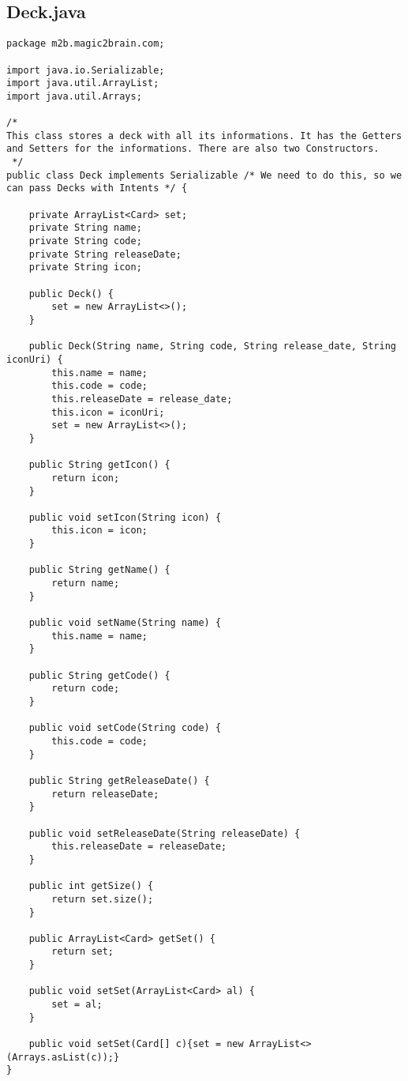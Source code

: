 \subsection*{Deck.java}
\begin{lstlisting}
package m2b.magic2brain.com;

import java.io.Serializable;
import java.util.ArrayList;
import java.util.Arrays;

/*
This class stores a deck with all its informations. It has the Getters and Setters for the informations. There are also two Constructors.
 */
public class Deck implements Serializable /* We need to do this, so we can pass Decks with Intents */ {

    private ArrayList<Card> set;
    private String name;
    private String code;
    private String releaseDate;
    private String icon;

    public Deck() {
        set = new ArrayList<>();
    }

    public Deck(String name, String code, String release_date, String iconUri) {
        this.name = name;
        this.code = code;
        this.releaseDate = release_date;
        this.icon = iconUri;
        set = new ArrayList<>();
    }

    public String getIcon() {
        return icon;
    }

    public void setIcon(String icon) {
        this.icon = icon;
    }

    public String getName() {
        return name;
    }

    public void setName(String name) {
        this.name = name;
    }

    public String getCode() {
        return code;
    }

    public void setCode(String code) {
        this.code = code;
    }

    public String getReleaseDate() {
        return releaseDate;
    }

    public void setReleaseDate(String releaseDate) {
        this.releaseDate = releaseDate;
    }

    public int getSize() {
        return set.size();
    }

    public ArrayList<Card> getSet() {
        return set;
    }

    public void setSet(ArrayList<Card> al) {
        set = al;
    }

    public void setSet(Card[] c){set = new ArrayList<>(Arrays.asList(c));}
}
\end{lstlisting}
\newpage

